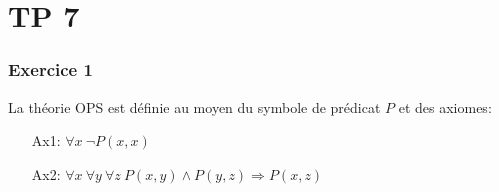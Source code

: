 \chapter*{TP 7}



% 
% 

\subsection*{Exercice 1}
La th\'{e}orie OPS est d\'{e}finie au moyen du symbole de pr\'{e}dicat $P$ et des axiomes:
\begin{enumerate}
\item[Ax1:] $\forall x \ \neg P(x, x)$
\item[Ax2:] $\forall x \ \forall y \ \forall z \ P(x, y) \wedge P(y, z) \Rightarrow P(x, z)$
\end{enumerate}

